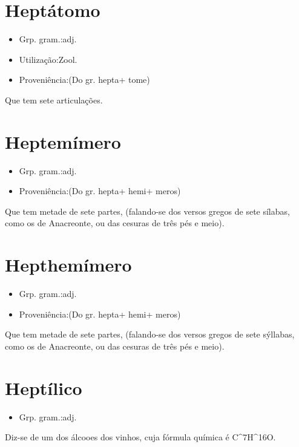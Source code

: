 \documentclass{article}
\begin{document}
\section{Heptátomo}
\begin{itemize}
\item {Grp. gram.:adj.}
\end{itemize}
\begin{itemize}
\item {Utilização:Zool.}
\end{itemize}
\begin{itemize}
\item {Proveniência:(Do gr. \textunderscore hepta\textunderscore  + \textunderscore tome\textunderscore )}
\end{itemize}
Que tem sete articulações.
\section{Heptemímero}
\begin{itemize}
\item {Grp. gram.:adj.}
\end{itemize}
\begin{itemize}
\item {Proveniência:(Do gr. \textunderscore hepta\textunderscore  + \textunderscore hemi\textunderscore  + \textunderscore meros\textunderscore )}
\end{itemize}
Que tem metade de sete partes, (falando-se dos versos gregos de sete sílabas, como os de Anacreonte, ou das cesuras de três pés e meio).
\section{Hepthemímero}
\begin{itemize}
\item {Grp. gram.:adj.}
\end{itemize}
\begin{itemize}
\item {Proveniência:(Do gr. \textunderscore hepta\textunderscore  + \textunderscore hemi\textunderscore  + \textunderscore meros\textunderscore )}
\end{itemize}
Que tem metade de sete partes, (falando-se dos versos gregos de sete sýllabas, como os de Anacreonte, ou das cesuras de três pés e meio).
\section{Heptílico}
\begin{itemize}
\item {Grp. gram.:adj.}
\end{itemize}
Diz-se de um dos álcooes dos vinhos, cuja fórmula química é C^{7}H^{16}O.
\end{document}
